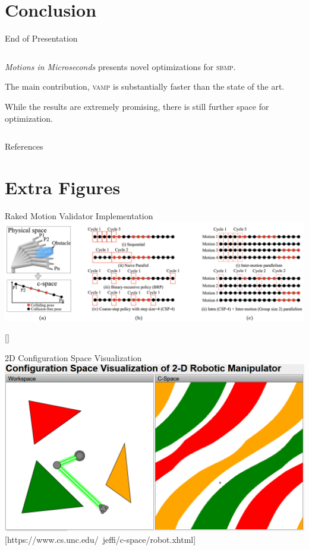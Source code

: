 \documentclass{beamer}
\begin{document}
\section{Conclusion}

\begin{frame}{End of Presentation}
\begin{columns}
\begin{column}{0.5\textwidth}
\textit{Motions in Microseconds} presents novel optimizations for \textsc{sbmp}.

The main contribution, \textsc{vamp} is substantially faster than the state of the art.

While the results are extremely promising, there is still further space for optimization.
\end{column}
\begin{column}{0.5\textwidth}
\centering
{}
\end{column}
\end{columns}
\end{frame}

\begin{frame}[allowframebreaks]{References}
        \printbibliography
\end{frame}

\section{Extra Figures}

\begin{frame}{Raked Motion Validator Implementation}
\includegraphics[width=\textwidth]{./assets/eemp_mv.png}

[\cite{paper:eemp}]
\end{frame}

\begin{frame}{2D Configuration Space Visualization}
\includegraphics[width=\textwidth]{./assets/c_space.png}
[https://www.cs.unc.edu/~jeffi/c-space/robot.xhtml]
\end{frame}
\end{document}

